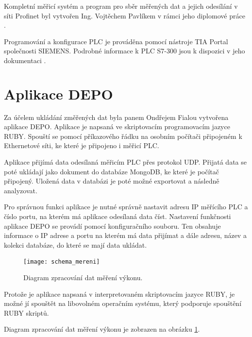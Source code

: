 Kompletní měřicí systém a program pro sběr měřených dat a jejich odesílání v síti Profinet byl vytvořen Ing. Vojtěchem Pavlíkem v rámci jeho diplomové práce \cite{vojtech_pavlik}. 

Programování a konfigurace PLC je prováděna pomocí nástroje TIA Portal společnosti SIEMENS. Podrobné informace k PLC S7-300 jsou k dispozici v jeho dokumentaci \cite{siemens_plc}.  

\section{Aplikace DEPO} 
\label{aplikacedepo}
Za účelem ukládání změřených dat byla panem Ondřejem Fialou vytvořena aplikace DEPO. Aplikace je napsaná ve skriptovacím programovacím jazyce RUBY. Spouští se pomocí příkazového řádku na osobním počítači připojeném k Ethernetové síti, ke které je připojeno i měřicí PLC. 

Aplikace přijímá data odesílaná měřicím PLC přes protokol UDP. Přijatá data se poté ukládají jako dokument do databáze MongoDB, ke které je počítač připojený. Uložená data v databázi je poté možné exportovat a následně analyzovat.

Pro správnou funkci aplikace je nutné správně nastavit adresu IP měřícího PLC a číslo portu, na kterém má aplikace odesílaná data číst. Nastavení funkčnosti aplikace DEPO se provádí pomocí konfiguračního souboru. Ten obsahuje informace o IP adrese a portu na kterém má data přijímat a dále adresu, název a kolekci databáze, do které se mají data ukládat.

\begin{figure}[ht]
\texttt{[image: schema\_mereni]}
\caption{Diagram zpracování dat měření výkonu.}
\label{schema_mereni_pic}
\end{figure}

Protože je aplikace napsaná v interpretovaném skriptovacím jazyce RUBY, je možné jí spouštět na libovolném operačním systému, který podporuje spouštění RUBY skriptů. 

Diagram zpracování dat měření výkonu je zobrazen na obrázku \ref{schema_mereni_pic}.

